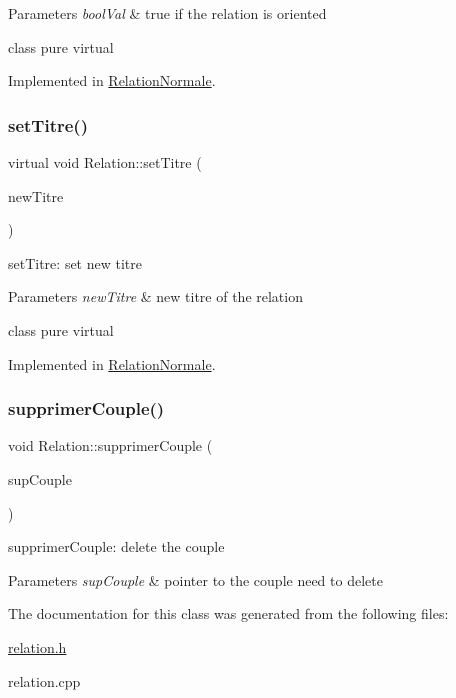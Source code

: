 \begin{DoxyParams}{Parameters}
{\em bool\+Val} & true if the relation is oriented\\
\hline
\end{DoxyParams}
class pure virtual 

Implemented in \hyperlink{class_relation_normale_a6095c88468d08fbe6c3d35fa5aedc635}{Relation\+Normale}.

\mbox{\label{class_relation_a1c08a802796f5fccaa5732ec1a96e542}} 
\subsubsection{\texorpdfstring{set\+Titre()}{setTitre()}}
{\footnotesize\ttfamily virtual void Relation\+::set\+Titre (\begin{DoxyParamCaption}\item[{const Q\+String \&}]{new\+Titre }\end{DoxyParamCaption})\hspace{0.3cm}{\ttfamily [pure virtual]}}



set\+Titre\+: set new titre 


\begin{DoxyParams}{Parameters}
{\em new\+Titre} & new titre of the relation\\
\hline
\end{DoxyParams}
class pure virtual 

Implemented in \hyperlink{class_relation_normale_abd0076a23f702ced9af181a0f046652c}{Relation\+Normale}.

\mbox{\label{class_relation_ac8e3f82f4d5afc302b4ee0f1641ba548}} 
\subsubsection{\texorpdfstring{supprimer\+Couple()}{supprimerCouple()}}
{\footnotesize\ttfamily void Relation\+::supprimer\+Couple (\begin{DoxyParamCaption}\item[{\hyperlink{class_couple}{Couple} $\ast$}]{sup\+Couple }\end{DoxyParamCaption})}



supprimer\+Couple\+: delete the couple 


\begin{DoxyParams}{Parameters}
{\em sup\+Couple} & pointer to the couple need to delete \\
\hline
\end{DoxyParams}


The documentation for this class was generated from the following files\+:\begin{DoxyCompactItemize}
\item 
\hyperlink{relation_8h}{relation.\+h}\item 
relation.\+cpp\end{DoxyCompactItemize}
